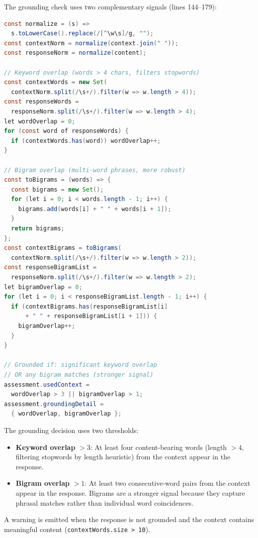 \documentclass[11pt]{article}
\begin{document}
The grounding check uses two complementary signals (lines 144--179):

\begin{lstlisting}[language=Java,caption={Grounding check --- lines 144--179}]
const normalize = (s) =>
  s.toLowerCase().replace(/[^\w\s]/g, "");
const contextNorm = normalize(context.join(" "));
const responseNorm = normalize(content);

// Keyword overlap (words > 4 chars, filters stopwords)
const contextWords = new Set(
  contextNorm.split(/\s+/).filter(w => w.length > 4));
const responseWords =
  responseNorm.split(/\s+/).filter(w => w.length > 4);
let wordOverlap = 0;
for (const word of responseWords) {
  if (contextWords.has(word)) wordOverlap++;
}

// Bigram overlap (multi-word phrases, more robust)
const toBigrams = (words) => {
  const bigrams = new Set();
  for (let i = 0; i < words.length - 1; i++) {
    bigrams.add(words[i] + " " + words[i + 1]);
  }
  return bigrams;
};
const contextBigrams = toBigrams(
  contextNorm.split(/\s+/).filter(w => w.length > 2));
const responseBigramList =
  responseNorm.split(/\s+/).filter(w => w.length > 2);
let bigramOverlap = 0;
for (let i = 0; i < responseBigramList.length - 1; i++) {
  if (contextBigrams.has(responseBigramList[i]
      + " " + responseBigramList[i + 1])) {
    bigramOverlap++;
  }
}

// Grounded if: significant keyword overlap
// OR any bigram matches (stronger signal)
assessment.usedContext =
  wordOverlap > 3 || bigramOverlap > 1;
assessment.groundingDetail =
  { wordOverlap, bigramOverlap };
\end{lstlisting}

The grounding decision uses two thresholds:
\begin{itemize}
  \item \textbf{Keyword overlap} $> 3$: At least four content-bearing words
        (length $> 4$, filtering stopwords by length heuristic) from the context
        appear in the response.
  \item \textbf{Bigram overlap} $> 1$: At least two consecutive-word pairs from
        the context appear in the response. Bigrams are a stronger signal because
        they capture phrasal matches rather than individual word coincidences.
\end{itemize}

A warning is emitted when the response is not grounded and the context contains
meaningful content (\texttt{contextWords.size > 10}).
\end{document}
